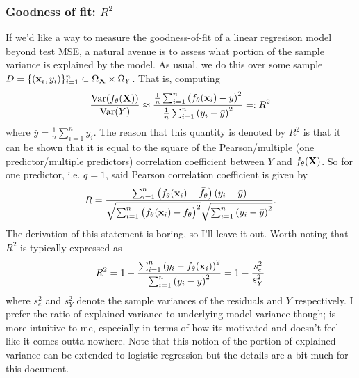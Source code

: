 \documentclass[11pt]{article}
\begin{document}
\subsubsection{Goodness of fit: $R^2$}
If we'd like a way to measure the goodness-of-fit of a linear regresison model beyond test MSE, a natural avenue is to assess what portion of the sample variance is explained by the model. As usual, we do this over some sample $D=\{(\mathbf{x}_i,y_i)\}_{i=1}^n\subset\Omega_{\mathbf{X}}\times\Omega_{Y}$. That is, computing
$$
\frac{\text{Var}(f_{\theta}(\mathbf{X}))}{\text{Var}(Y)}
\approx
\frac{\frac{1}{n}\sum_{i=1}^n\left(f_{\theta}(\mathbf{x}_i)-\bar{y}\right)^2}{\frac{1}{n}\sum_{i=1}^n\left(y_i-\bar{y}\right)^2}
=:
R^2
$$
where $\bar{y}=\frac{1}{n}\sum_{i=1}^ny_i$. The reason that this quantity is denoted by $R^2$ is that it can be shown that it is equal to the square of the Pearson/multiple (one predictor/multiple predictors) correlation coefficient between $Y$ and $f_{\theta}(\mathbf{X})$. So for one predictor, i.e. $q=1$, said Pearson correlation coefficient is given by
$$
R
=
\frac{\sum_{i=1}^n\left(f_{\theta}(\mathbf{x}_i)-\bar{f}_{\theta}\right)(y_i-\bar{y})}{\sqrt{\sum_{i=1}^n\left(f_{\theta}(\mathbf{x}_i)-\bar{f}_{\theta}\right)^2}\sqrt{\sum_{i=1}^n\left(y_i-\bar{y}\right)^2}}.
$$
The derivation of this statement is boring, so I'll leave it out. Worth noting that $R^2$ is typically expressed as
$$
R^2
=
1-\frac{\sum_{i=1}^n\left(y_i-f_{\theta}(\mathbf{x}_i)\right)^2}{\sum_{i=1}^n\left(y_i-\bar{y}\right)^2}
=
1-\frac{s_e^2}{s_Y^2}
$$
where $s_e^2$ and $s_Y^2$ denote the sample variances of the residuals and $Y$ respectively. I prefer the ratio of explained variance to underlying model variance though; is more intuitive to me, especially in terms of how its motivated and doesn't feel like it comes outta nowhere. Note that this notion of the portion of explained variance can be extended to logistic regression but the details are a bit much for this document.

\end{document}
